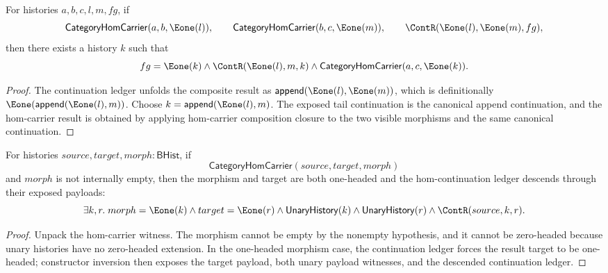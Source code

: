 \begin{theorem}
\label{thm:category-hom-carrier-comp-visible-morphisms-result-cases}
For histories $a,b,c,l,m,fg$, if
$$
\mathsf{CategoryHomCarrier}(a,b,\Eone(l)),\qquad
\mathsf{CategoryHomCarrier}(b,c,\Eone(m)),\qquad
\ContR(\Eone(l),\Eone(m),fg),
$$
then there exists a history $k$ such that
$$
fg=\Eone(k)\land
\ContR(\Eone(l),m,k)\land
\mathsf{CategoryHomCarrier}(a,c,\Eone(k)).
$$
\end{theorem}
\begin{proof}
The continuation ledger unfolds the composite result as
$\mathsf{append}(\Eone(l),\Eone(m))$, which is definitionally
$\Eone(\mathsf{append}(\Eone(l),m))$. Choose
$k=\mathsf{append}(\Eone(l),m)$. The exposed tail continuation is the canonical
append continuation, and the hom-carrier result is obtained by applying
hom-carrier composition closure to the two visible morphisms and the same
canonical continuation.
\end{proof}

\begin{theorem}
\label{thm:category-hom-carrier-nonempty-morphism-target-visible}
For histories $source,target,morph:\mathsf{BHist}$, if
$$
\mathsf{CategoryHomCarrier}(source,target,morph)
$$
and $morph$ is not internally empty, then the morphism and target are both
one-headed and the hom-continuation ledger descends through their exposed
payloads:
$$
\exists k,r.\;
morph=\Eone(k)\land target=\Eone(r)\land
\mathsf{UnaryHistory}(k)\land \mathsf{UnaryHistory}(r)\land
\ContR(source,k,r).
$$
\end{theorem}
\begin{proof}
Unpack the hom-carrier witness. The morphism cannot be empty by the nonempty
hypothesis, and it cannot be zero-headed because unary histories have no
zero-headed extension. In the one-headed morphism case, the continuation
ledger forces the result target to be one-headed; constructor inversion then
exposes the target payload, both unary payload witnesses, and the descended
continuation ledger.
\end{proof}

